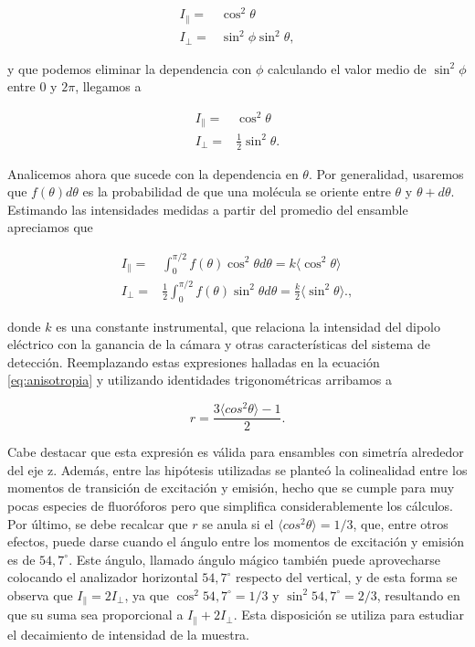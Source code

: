 \begin{align}
    I_{\parallel} = & \cos^{2} \theta \label{eq:IntProyPar}\\
    I_{\perp}     = & \sin^{2} \phi \sin^{2} \theta, \label{eq:IntProyPerp}
\end{align}

\noindent y que podemos eliminar la dependencia con $\phi$ calculando el valor medio de $\sin^{2} \phi$ entre $0$ y $2\pi$, llegamos a

\begin{align}
    I_{\parallel} = & \cos^{2} \theta \label{eq:IntProyPar2}\\
    I_{\perp}     = & \frac{1}{2} \sin^{2} \theta. \label{eq:IntProyPerp2}
\end{align}

Analicemos ahora que sucede con la dependencia en $\theta$. Por generalidad, usaremos que $f(\theta) d\theta$ es la probabilidad de que una molécula se oriente entre $\theta$ y $\theta + d\theta$. Estimando las intensidades medidas a partir del promedio del ensamble apreciamos que

\begin{align}
    I_{\parallel} = & \int_0^{\pi/2} f(\theta) \cos^{2} \theta d\theta = k \langle \cos^{2} \theta \rangle \label{eq:IntProyPar3}\\
    I_{\perp}     = & \frac{1}{2} \int_0^{\pi/2} f(\theta) \sin^{2} \theta d\theta = \frac{k}{2} \langle \sin^{2} \theta \rangle. \label{eq:IntProyPerp3},
\end{align}

\noindent donde $k$ es una constante instrumental, que relaciona la intensidad del dipolo eléctrico con la ganancia de la cámara y otras características del sistema de detección. Reemplazando estas expresiones halladas en la ecuación \ref{eq:anisotropia} y utilizando identidades trigonométricas arribamos a

\begin{equation}
    r = \frac{3 \langle cos ^2 \theta \rangle - 1}{2}.
    \label{eq:anisotropiamedio}
\end{equation}

\noindent Cabe destacar que esta expresión es válida para ensambles con simetría alrededor del eje z. Además, entre las hipótesis utilizadas se planteó la colinealidad entre los momentos de transición de excitación y emisión, hecho que se cumple para muy pocas especies de fluoróforos pero que simplifica considerablemente los cálculos. Por último, se debe recalcar que $r$ se anula si el $\langle cos ^2 \theta \rangle = 1/3$, que, entre otros efectos, puede darse cuando el ángulo entre los momentos de excitación y emisión es de $54,7^{\circ}$. Este ángulo, llamado ángulo mágico también puede aprovecharse colocando el analizador horizontal $54,7^{\circ}$ respecto del vertical, y de esta forma se observa que $I_{\parallel} = 2 I_{\perp}$, ya que $\cos^{2} 54,7^{\circ} = 1/3$ y $\sin^{2} 54,7^{\circ} = 2/3$, resultando en que su suma sea proporcional a $I_{\parallel} + 2 I_{\perp}$. Esta disposición se utiliza para estudiar el decaimiento de intensidad de la muestra.

